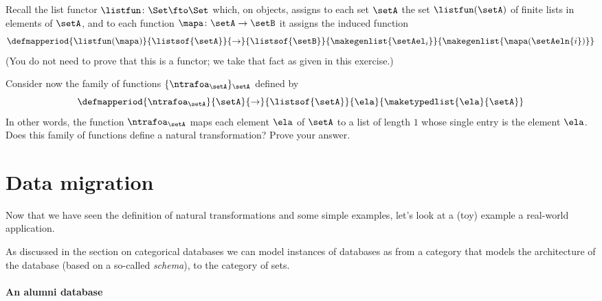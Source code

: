 \begin{gradedexercise}

    Recall the list functor $\listfun \colon \Set \fto \Set$ which, on objects, assigns to each set $\setA$ the set $\listfun(\setA)$ of finite lists in elements of $\setA$, and to each function $\mapa \colon \setA \to \setB$ it assigns the induced function
    \begin{equation}\label{eq:list-functor-on-functions}
        \defmapperiod{
            \listfun(\mapa)
        }{
            \listsof{\setA}
        }{
            \to
        }{
            \listsof{\setB}
        }{
            \makegenlist{ \setAel_i }
        }{
            \makegenlist{ \mapa(\setAeln{i}) }
        }
    \end{equation}
    (You do not need to prove that this is a functor; we take that fact as given in this exercise.)

    Consider now the family of functions $\{ \ntrafoa_\setA \}_\setA$ defined by
    \begin{equation}
        \defmapperiod{
            \ntrafoa_\setA
        }{
            \setA
        }{
            \to
        }{
            \listsof{\setA}
        }{
            \ela
        }{
            \maketypedlist{\ela}{\setA}
        }
    \end{equation}
    In other words, the function $\ntrafoa_\setA$ maps each element $\ela$ of $\setA$ to a list of length $1$ whose single entry is the element $\ela$.
    Does this family of functions define a natural transformation? Prove your answer.
\end{gradedexercise}


\clearpage
\section{Data migration}
Now that we have seen the definition of natural transformations and some simple examples, let's look at a (toy) example a real-world application. 

As discussed in the section on categorical databases 
we can model instances of databases as  from a category that models the architecture of the database (based on a so-called \emph{schema}), to the category of sets.

\paragraph{An alumni database}

